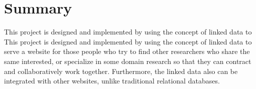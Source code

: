 \section{Summary}
\label{sec:summary}

This project is designed and implemented by using the concept of linked data to This project is designed and implemented by using the concept of linked data to serve a website for those people who try to find other researchers who share the same interested, or specialize in some domain research so that they can contract and collaboratively work together. Furthermore, the linked data also can be integrated with other websites, unlike traditional relational databases. 
